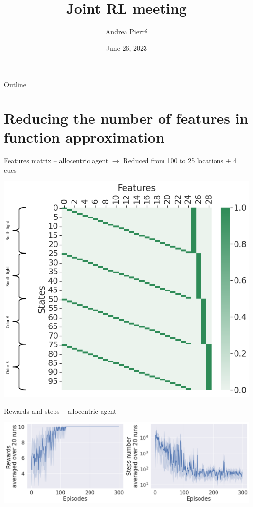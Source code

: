 \documentclass[bigger]{beamer}
\author{Andrea Pierré}
\date{June 26, 2023}
\title{Joint RL meeting}
\institute{Brown University}
\begin{document}
\maketitle
\begin{frame}[plain]{Outline}
\tableofcontents
\end{frame}

\section{Reducing the number of features in function approximation}
\label{sec:org1f3d9c9}
\begin{frame}[label={sec:orgf84cdaf}]{Features matrix -- allocentric agent}
\(\to\) Reduced from 100 to 25 locations + 4 cues
\begin{center}
\includegraphics[height=0.8\textheight]{img/FuncApprox-allo-features-matrix.png}
\end{center}
\end{frame}
\begin{frame}[label={sec:org9d007fb}]{Rewards and steps -- allocentric agent}
\begin{center}
\includegraphics[width=\textwidth]{img/FuncApprox-allo-rewards-steps.png}
\end{center}
\end{frame}
\end{document}
